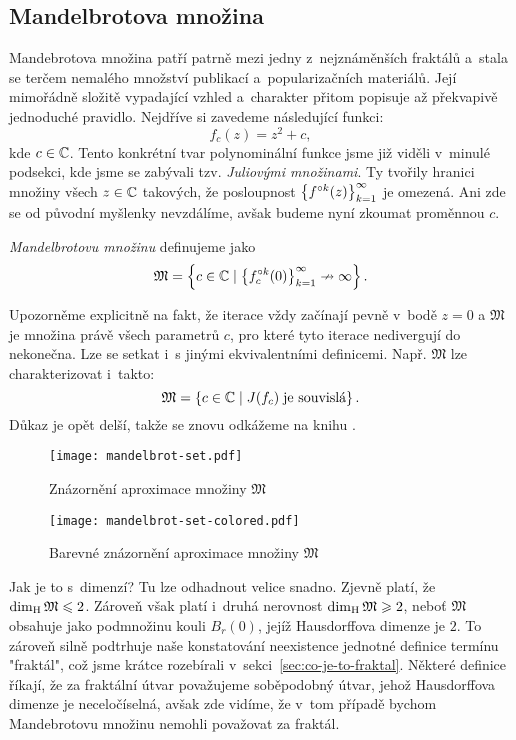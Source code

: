 \subsection{Mandelbrotova množina}\label{subsec:mandebrotova-mnozina}

Mandebrotova množina patří patrně mezi jedny z~nejznáměnších fraktálů a~stala se terčem nemalého množství publikací a~popularizačních materiálů. Její mimořádně složitě vypadající vzhled a~charakter přitom popisuje až překvapivě jednoduché pravidlo. Nejdříve si zavedeme následující funkci:
\[f_c(z)=z^2+c,\]
kde $c\in\mathbb{C}$. Tento konkrétní tvar polynominální funkce jsme již viděli v~minulé podsekci, kde jsme se zabývali tzv. \emph{Juliovými množinami}. Ty tvořily hranici množiny všech $z\in\mathbb{C}$ takových, že posloupnost $\left\{f^{\circ k}(z)\right\}_{k=1}^\infty$ je omezená. Ani zde se od původní myšlenky nevzdálíme, avšak budeme nyní zkoumat proměnnou $c$.
\begin{definition}\label{def:mandebrotova-mnozina}
    \emph{Mandelbrotovu množinu} definujeme jako
    \[\mathfrak{M}=\left\{c\in\mathbb{C}\mid \left\{f_c^{\circ k}(0)\right\}_{k=1}^\infty\nrightarrow\infty\right\}.\]
\end{definition}
Upozorněme explicitně na fakt, že iterace vždy začínají pevně v~bodě $z=0$ a $\mathfrak{M}$ je množina právě všech parametrů $c$, pro které tyto iterace nedivergují do nekonečna. Lze se setkat i~s jinými ekvivalentními definicemi. Např. $\mathfrak{M}$ lze charakterizovat i~takto:
\[\mathfrak{M}=\left\{c\in\mathbb{C}\mid J(f_c)\;\text{je souvislá}\right\}.\]
Důkaz je opět delší, takže se znovu odkážeme na knihu \citep[str. 245]{Falconer1989}.
\begin{figure}[h]
    \centering
    \texttt{[image: mandelbrot-set.pdf]}
    \caption{Znázornění aproximace množiny $\mathfrak{M}$}
    \label{fig:znazorneni-mandebrotovy-mnoziny}
\end{figure}
\begin{figure}[h]
    \centering
    \texttt{[image: mandelbrot-set-colored.pdf]}
    \caption{Barevné znázornění aproximace množiny $\mathfrak{M}$}
    \label{fig:znazorneni-mandebrotovy-mnoziny-vybarveno}
\end{figure}
Jak je to s~dimenzí? Tu lze odhadnout velice snadno. Zjevně platí, že $\operatorname{dim_H}{\mathfrak{M}}\leqslant 2$. Zároveň však platí i~druhá nerovnost $\operatorname{dim_H}{\mathfrak{M}}\geqslant 2$, neboť $\mathfrak{M}$ obsahuje jako podmnožinu kouli $B_r(0)$, jejíž Hausdorffova dimenze je $2$. To zároveň silně podtrhuje naše konstatování neexistence jednotné definice termínu "fraktál", což jsme krátce rozebírali v~sekci~\ref{sec:co-je-to-fraktal}. Některé definice říkají, že za fraktální útvar považujeme soběpodobný útvar, jehož Hausdorffova dimenze je neceločíselná, avšak zde vidíme, že v~tom případě bychom Mandebrotovu množinu nemohli považovat za fraktál.